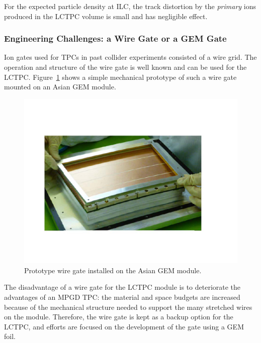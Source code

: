 For the expected particle density at ILC, the track distortion by the
{\em{primary}} ions produced in the LCTPC volume is small and has negligible effect.



\subsubsection{Engineering Challenges: a Wire Gate or a GEM Gate}

Ion gates used for TPCs in past collider experiments consisted of a wire grid. The operation and
structure of the wire gate is well known and can be used for the LCTPC. Figure~\ref{Fig2gating} shows
a simple mechanical prototype of such a wire gate mounted on an Asian GEM module.


\begin{figure}[htb!]
\begin{center}
\includegraphics[width=\columnwidth]{plots/TPC-Gate_Fig2gating.pdf}%
\caption{\label{Fig2gating} {Prototype wire gate installed on the Asian GEM module.}}
\end{center}
\end{figure}

The disadvantage of a wire gate for the LCTPC module is to deteriorate the advantages of an MPGD TPC:
the material and space budgets are increased because of the mechanical structure needed to support the many
stretched wires on the module. Therefore, the wire gate is kept as a backup option for the LCTPC, and efforts
are focused on the development of the gate using a GEM foil.

